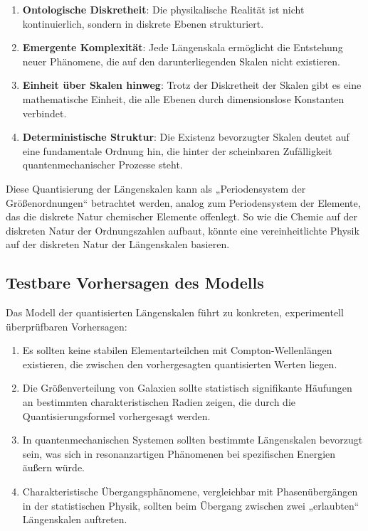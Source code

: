 \documentclass[12pt,a4paper]{article}
\begin{document}
	\begin{enumerate}
		\item \textbf{Ontologische Diskretheit}: Die physikalische Realität ist nicht kontinuierlich, sondern in diskrete Ebenen strukturiert.
		
		\item \textbf{Emergente Komplexität}: Jede Längenskala ermöglicht die Entstehung neuer Phänomene, die auf den darunterliegenden Skalen nicht existieren.
		
		\item \textbf{Einheit über Skalen hinweg}: Trotz der Diskretheit der Skalen gibt es eine mathematische Einheit, die alle Ebenen durch dimensionslose Konstanten verbindet.
		
		\item \textbf{Deterministische Struktur}: Die Existenz bevorzugter Skalen deutet auf eine fundamentale Ordnung hin, die hinter der scheinbaren Zufälligkeit quantenmechanischer Prozesse steht.
	\end{enumerate}
	
	Diese Quantisierung der Längenskalen kann als „Periodensystem der Größenordnungen“ betrachtet werden, analog zum Periodensystem der Elemente, das die diskrete Natur chemischer Elemente offenlegt. So wie die Chemie auf der diskreten Natur der Ordnungszahlen aufbaut, könnte eine vereinheitlichte Physik auf der diskreten Natur der Längenskalen basieren.
	
	\subsection{Testbare Vorhersagen des Modells}
	
	Das Modell der quantisierten Längenskalen führt zu konkreten, experimentell überprüfbaren Vorhersagen:
	
	\begin{enumerate}
		\item Es sollten keine stabilen Elementarteilchen mit Compton-Wellenlängen existieren, die zwischen den vorhergesagten quantisierten Werten liegen.
		
		\item Die Größenverteilung von Galaxien sollte statistisch signifikante Häufungen an bestimmten charakteristischen Radien zeigen, die durch die Quantisierungsformel vorhergesagt werden.
		
		\item In quantenmechanischen Systemen sollten bestimmte Längenskalen bevorzugt sein, was sich in resonanzartigen Phänomenen bei spezifischen Energien äußern würde.
		
		\item Charakteristische Übergangsphänomene, vergleichbar mit Phasenübergängen in der statistischen Physik, sollten beim Übergang zwischen zwei „erlaubten“ Längenskalen auftreten.
	\end{enumerate}
	
\end{document}
